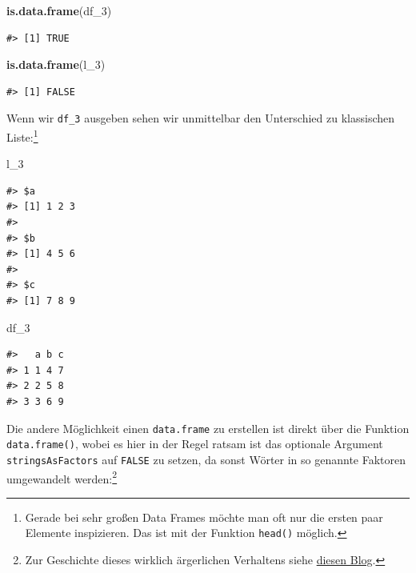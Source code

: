 \documentclass[]{tufte-book}
\newenvironment{Shaded}{}{}
\newcommand{\KeywordTok}[1]{\textcolor[rgb]{0.00,0.44,0.13}{\textbf{#1}}}
\newcommand{\DecValTok}[1]{\textcolor[rgb]{0.25,0.63,0.44}{#1}}
\newcommand{\NormalTok}[1]{#1}
\begin{document}
\begin{Shaded}
\begin{Highlighting}[]
\KeywordTok{is.data.frame}\NormalTok{(df_}\DecValTok{3}\NormalTok{)}
\end{Highlighting}
\end{Shaded}

\begin{verbatim}
#> [1] TRUE
\end{verbatim}

\begin{Shaded}
\begin{Highlighting}[]
\KeywordTok{is.data.frame}\NormalTok{(l_}\DecValTok{3}\NormalTok{)}
\end{Highlighting}
\end{Shaded}

\begin{verbatim}
#> [1] FALSE
\end{verbatim}

Wenn wir \texttt{df\_3} ausgeben sehen wir unmittelbar den Unterschied
zu klassischen Liste:\footnote{Gerade bei sehr großen Data Frames möchte
  man oft nur die ersten paar Elemente inspizieren. Das ist mit der
  Funktion \texttt{head()} möglich.}

\begin{Shaded}
\begin{Highlighting}[]
\NormalTok{l_}\DecValTok{3}
\end{Highlighting}
\end{Shaded}

\begin{verbatim}
#> $a
#> [1] 1 2 3
#> 
#> $b
#> [1] 4 5 6
#> 
#> $c
#> [1] 7 8 9
\end{verbatim}

\begin{Shaded}
\begin{Highlighting}[]
\NormalTok{df_}\DecValTok{3}
\end{Highlighting}
\end{Shaded}

\begin{verbatim}
#>   a b c
#> 1 1 4 7
#> 2 2 5 8
#> 3 3 6 9
\end{verbatim}

Die andere Möglichkeit einen \texttt{data.frame} zu erstellen ist direkt
über die Funktion \texttt{data.frame()}, wobei es hier in der Regel
ratsam ist das optionale Argument \texttt{stringsAsFactors} auf
\texttt{FALSE} zu setzen, da sonst Wörter in so genannte Faktoren
umgewandelt werden:\footnote{Zur Geschichte dieses wirklich ärgerlichen
  Verhaltens siehe
  \href{https://simplystatistics.org/2015/07/24/stringsasfactors-an-unauthorized-biography/}{diesen
  Blog}.}
\end{document}
